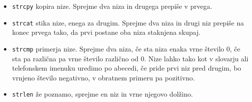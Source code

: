 \begin{itemize}
    \item \verb+strcpy+ kopira nize. Sprejme dva niza in drugega prepiše v
        prvega.
    \item \verb+strcat+ stika nize, enega za drugim. Sprejme dva niza in drugi
        niz prepiše na konec prvega tako, da prvi postane oba niza staknjena
        skupaj.
    \item \verb+strcmp+ primerja nize. Sprejme dva niza, če sta niza enaka vrne
        število 0, če sta pa različna pa vrne število različno od 0. Nize lahko
        tako kot v slovarju ali telefonskem imenuku uredimo po abecedi, če
        pride prvi niz pred drugim, bo vrnjeno število negativno, v obratnem
        primeru pa pozitivno.
    \item \verb+strlen+ že poznamo, sprejme en niz in vrne njegovo dolžino.
\end{itemize}

\begin{examples}
\end{examples}


